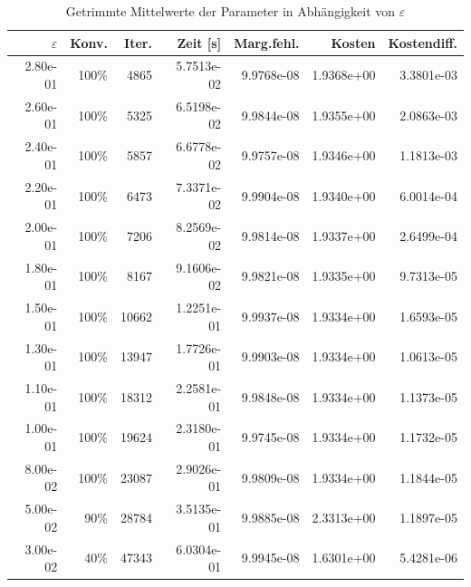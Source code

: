 \begin{table}[htbp]
\caption{Getrimmte Mittelwerte der Parameter in Abhängigkeit von $\varepsilon$}
\label{tab:Parametertest64_2}
\small
\centering
{}
\begin{tabular}{rrrrrrr}
\toprule
$\varepsilon$ & Konv. & Iter. & Zeit [s] & Marg.fehl. & Kosten & Kostendiff. \\
\midrule
2.80e-01 & 100\% & 4865 & 5.7513e-02 & 9.9768e-08 & 1.9368e+00 & 3.3801e-03 \\
2.60e-01 & 100\% & 5325 & 6.5198e-02 & 9.9844e-08 & 1.9355e+00 & 2.0863e-03 \\
2.40e-01 & 100\% & 5857 & 6.6778e-02 & 9.9757e-08 & 1.9346e+00 & 1.1813e-03 \\
2.20e-01 & 100\% & 6473 & 7.3371e-02 & 9.9904e-08 & 1.9340e+00 & 6.0014e-04 \\
2.00e-01 & 100\% & 7206 & 8.2569e-02 & 9.9814e-08 & 1.9337e+00 & 2.6499e-04 \\
1.80e-01 & 100\% & 8167 & 9.1606e-02 & 9.9821e-08 & 1.9335e+00 & 9.7313e-05 \\
1.50e-01 & 100\% & 10662 & 1.2251e-01 & 9.9937e-08 & 1.9334e+00 & 1.6593e-05 \\
1.30e-01 & 100\% & 13947 & 1.7726e-01 & 9.9903e-08 & 1.9334e+00 & 1.0613e-05 \\
1.10e-01 & 100\% & 18312 & 2.2581e-01 & 9.9848e-08 & 1.9334e+00 & 1.1373e-05 \\
1.00e-01 & 100\% & 19624 & 2.3180e-01 & 9.9745e-08 & 1.9334e+00 & 1.1732e-05 \\
8.00e-02 & 100\% & 23087 & 2.9026e-01 & 9.9809e-08 & 1.9334e+00 & 1.1844e-05 \\
5.00e-02 & 90\% & 28784 & 3.5135e-01 & 9.9885e-08 & 2.3313e+00 & 1.1897e-05 \\
3.00e-02 & 40\% & 47343 & 6.0304e-01 & 9.9945e-08 & 1.6301e+00 & 5.4281e-06 \\
\bottomrule
\end{tabular}
\end{table}
